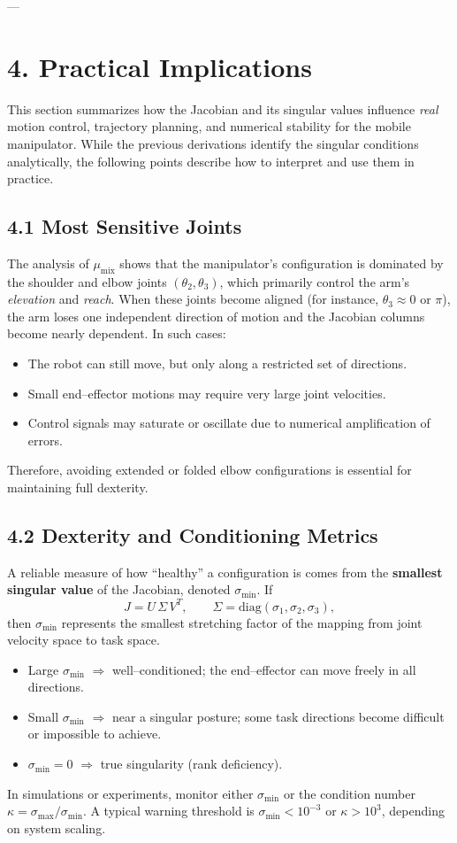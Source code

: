 \documentclass[12pt,a4paper]{article}
\begin{document}
---

\section*{4. Practical Implications}

This section summarizes how the Jacobian and its singular values influence
\emph{real} motion control, trajectory planning, and numerical stability
for the mobile manipulator.  
While the previous derivations identify the singular conditions analytically,
the following points describe how to interpret and use them in practice.

\subsection*{4.1 Most Sensitive Joints}
The analysis of $\mu_{\text{mix}}$ shows that the manipulator's
configuration is dominated by the shoulder and elbow joints
$(\theta_2,\theta_3)$, which primarily control the arm's
\emph{elevation} and \emph{reach}.
When these joints become aligned (for instance,
$\theta_3 \approx 0$ or $\pi$), the arm loses one independent direction of
motion and the Jacobian columns become nearly dependent.
In such cases:
\begin{itemize}
  \item The robot can still move, but only along a restricted set of directions.
  \item Small end--effector motions may require very large joint velocities.
  \item Control signals may saturate or oscillate due to numerical
        amplification of errors.
\end{itemize}
Therefore, avoiding extended or folded elbow configurations is essential
for maintaining full dexterity.

\subsection*{4.2 Dexterity and Conditioning Metrics}
A reliable measure of how ``healthy'' a configuration is
comes from the \textbf{smallest singular value} of the Jacobian,
denoted $\sigma_{\min}$.
If
\[
J = U\,\Sigma\,V^{T}, \qquad
\Sigma = \mathrm{diag}(\sigma_1,\sigma_2,\sigma_3),
\]
then $\sigma_{\min}$ represents the smallest stretching factor of the
mapping from joint velocity space to task space.
\begin{itemize}
  \item Large $\sigma_{\min}$ $\Rightarrow$ well--conditioned;
        the end--effector can move freely in all directions.
  \item Small $\sigma_{\min}$ $\Rightarrow$ near a singular posture;
        some task directions become difficult or impossible to achieve.
  \item $\sigma_{\min} = 0$ $\Rightarrow$ true singularity (rank deficiency).
\end{itemize}
In simulations or experiments, monitor either $\sigma_{\min}$
or the condition number
$\kappa = \sigma_{\max}/\sigma_{\min}$.
A typical warning threshold is
$\sigma_{\min} < 10^{-3}$ or $\kappa > 10^{3}$,
depending on system scaling.
\end{document}
